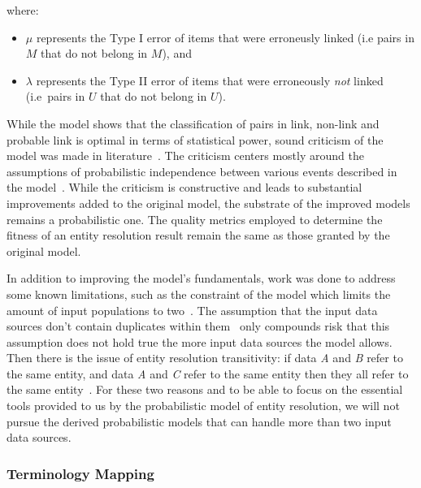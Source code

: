 where:

\begin{itemize}
    \item $\mu$ represents the Type I error of items that were erroneusly
    linked (i.e pairs in $M$ that do not belong in $M$), and
    \item $\lambda$ represents the Type II error of items that were
    erroneously \textit{not} linked (i.e~pairs in $U$ that do not belong in
    $U$).
\end{itemize}

While the model shows that the classification of pairs in link, non-link and
probable link is optimal in terms of statistical power, sound criticism of the
model was made in literature~\cite{tancredi2011fsmcrit}.
The criticism centers mostly around the assumptions of probabilistic
independence between various events described in the model~\cite{winkler2014matching,tancredi2011fsmcrit}.
While the criticism is constructive and leads to substantial improvements added
to the original model, the substrate of the improved models remains a
probabilistic one.
The quality metrics employed to determine the fitness of an entity resolution
result remain the same as those granted by the original model.

In addition to improving the model's fundamentals, work was done to address some
known limitations, such as the constraint of the model which limits the amount
of input populations to two~\cite{sad2013genfsm,Kon19}.
The assumption that the input data sources don't contain duplicates within
them~\cite{fs1969,sad2014fsmdup} only compounds risk that this assumption does
not hold true the more input data sources the model allows.
Then there is the issue of entity resolution transitivity: if data \textit{A}
and \textit{B} refer to the same entity, and data \textit{A} and \textit{C}
refer to the same entity then they all refer to the same entity~\cite{Tal11}.
For these two reasons and to be able to focus on the essential tools provided to
us by the probabilistic model of entity resolution, we will not pursue the
derived probabilistic models that can handle more than two input data sources. 

\subsubsection[fms-term]{Terminology Mapping}\label{subsubsec:fsm-term}

